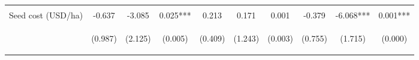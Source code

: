 \begin{center}
\begin{tabular}{lccccccccc}
\vspace{4pt} & \begin{footnotesize}[0.190]\end{footnotesize} & \begin{footnotesize}[0.081]\end{footnotesize} & \begin{footnotesize}[0.790]\end{footnotesize} & \begin{footnotesize}[0.384]\end{footnotesize} & \begin{footnotesize}[0.859]\end{footnotesize} & \begin{footnotesize}[0.334]\end{footnotesize} & \begin{footnotesize}[0.210]\end{footnotesize} & \begin{footnotesize}[0.376]\end{footnotesize} & \begin{footnotesize}[0.545]\end{footnotesize} \\
Seed cost (USD/ha) & -0.637 & -3.085 & 0.025*** & 0.213 & 0.171 & 0.001 & -0.379 & -6.068*** & 0.001*** \\
 & \begin{footnotesize}(0.987)\end{footnotesize} & \begin{footnotesize}(2.125)\end{footnotesize} & \begin{footnotesize}(0.005)\end{footnotesize} & \begin{footnotesize}(0.409)\end{footnotesize} & \begin{footnotesize}(1.243)\end{footnotesize} & \begin{footnotesize}(0.003)\end{footnotesize} & \begin{footnotesize}(0.755)\end{footnotesize} & \begin{footnotesize}(1.715)\end{footnotesize} & \begin{footnotesize}(0.000)\end{footnotesize} \\

\end{tabular}
\end{center}
